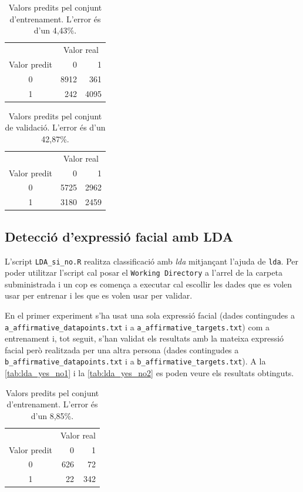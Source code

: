 \documentclass[a4paper]{article}
\begin{document}
\begin{table}[H]
	\centering
	\def\arraystretch{1.5}
	\begin{tabular}{c|rr}
		& \multicolumn{2}{c}{Valor real} \\
		Valor predit & 0 & 1 \\
		\hline
		0 & 8912 & 361 \\
		1 & 242 & 4095 \\
	\end{tabular}
	\caption{Valors predits pel conjunt d'entrenament. L'error és d'un 4,43\%.}
	\label{tab:reglog_training3}
\end{table}

\begin{table}[H]
	\centering
	\def\arraystretch{1.5}
	\begin{tabular}{c|rr}
		& \multicolumn{2}{c}{Valor real} \\
		Valor predit & 0 & 1 \\
		\hline
		0 & 5725 & 2962 \\
		1 & 3180 & 2459 \\
	\end{tabular}
	\caption{Valors predits pel conjunt de validació. L'error és d'un 42,87\%.}
	\label{tab:reglog_training4}
\end{table}

\subsection{Detecció d'expressió facial amb LDA}
L'script \verb|LDA_si_no.R| realitza classificació amb \emph{lda} mitjançant l'ajuda de \verb|lda|. Per poder utilitzar l'script cal posar el \verb|Working Directory| a l'arrel de la carpeta subministrada i un cop es comença a executar cal escollir les dades que es volen usar per entrenar i les que es volen usar per validar.

En el primer experiment s'ha usat una sola expressió facial (dades contingudes a \verb|a_affirmative_datapoints.txt| i a \verb|a_affirmative_targets.txt|) com a entrenament i, tot seguit, s'han validat els resultats amb la mateixa expressió facial però realitzada per una altra persona (dades contingudes a \verb|b_affirmative_datapoints.txt| i a \verb|b_affirmative_targets.txt|). A la \autoref{tab:lda_yes_no1} i la \autoref{tab:lda_yes_no2} es poden veure els resultats obtinguts.

\begin{table}[H]
	\centering
	\def\arraystretch{1.5}
	\begin{tabular}{c|rr}
		& \multicolumn{2}{c}{Valor real} \\
		Valor predit & 0 & 1 \\
		\hline
		0 & 626 & 72 \\
		1 & 22 & 342 \\
	\end{tabular}
	\caption{Valors predits pel conjunt d'entrenament. L'error és d'un 8,85\%.}
	\label{tab:lda_yes_no1}
\end{table}
\end{document}
